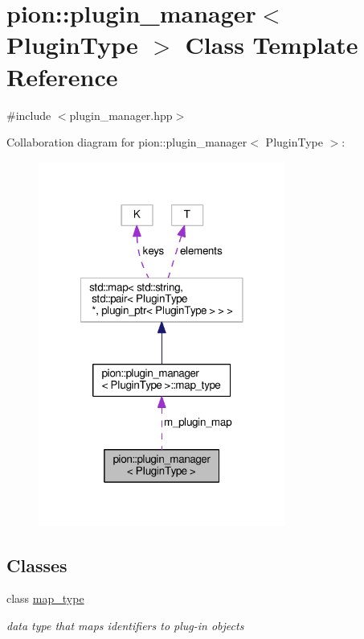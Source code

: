 \hypertarget{classpion_1_1plugin__manager}{\section{pion\-:\-:plugin\-\_\-manager$<$ Plugin\-Type $>$ Class Template Reference}
\label{classpion_1_1plugin__manager}
}


{\ttfamily \#include $<$plugin\-\_\-manager.\-hpp$>$}



Collaboration diagram for pion\-:\-:plugin\-\_\-manager$<$ Plugin\-Type $>$\-:
\nopagebreak
\begin{figure}[H]
\begin{center}
\leavevmode
\includegraphics[width=230pt]{classpion_1_1plugin__manager__coll__graph}
\end{center}
\end{figure}
\subsection*{Classes}
\begin{DoxyCompactItemize}
\item 
class \hyperlink{classpion_1_1plugin__manager_1_1map__type}{map\-\_\-type}
\begin{DoxyCompactList}\small\item\em data type that maps identifiers to plug-\/in objects \end{DoxyCompactList}\end{DoxyCompactItemize}
